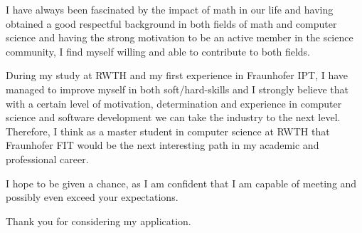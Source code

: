 I have always been fascinated by the impact of math in our life and having obtained a good respectful background in both fields of math and computer science and having the strong motivation to be an active member in the science community, I find myself willing and able to contribute to both fields.

During my study at RWTH  and my first experience in Fraunhofer IPT, I have managed to improve myself in both soft/hard-skills and I strongly believe that with a certain level of motivation, determination and experience in computer science and software development we can take the industry to the next level. Therefore, I think as a master student in computer science at RWTH that Fraunhofer FIT would be the next interesting path in my academic and professional career.

I hope to be given a chance, as I am confident that I am capable of meeting and possibly even exceed your expectations.

Thank you for considering my application.


  
%
{\bfseries \firstname~\familyname}\\
%
\vfill%

